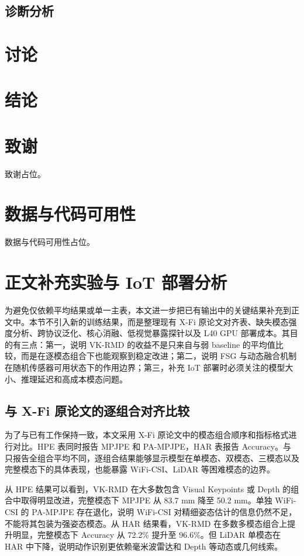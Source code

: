 \documentclass[journal]{IEEEtran}
\begin{document}
\subsection{诊断分析}

\section{讨论}

\section{结论}

\section*{致谢}
致谢占位。

\section*{数据与代码可用性}
数据与代码可用性占位。

\section{正文补充实验与 IoT 部署分析}

为避免仅依赖平均结果或单一主表，本文进一步把已有输出中的关键结果补充到正文中。本节不引入新的训练结果，而是整理现有 X-Fi 原论文对齐表、缺失模态强度分析、跨协议泛化、核心消融、低视觉暴露探针以及 L40 GPU 部署成本。其目的有三点：第一，说明 VK-RMD 的收益不是只来自与弱 baseline 的平均值比较，而是在逐模态组合下也能观察到稳定改进；第二，说明 FSG 与动态融合机制在随机传感器可用状态下的作用边界；第三，补充 IoT 部署时必须关注的模型大小、推理延迟和高成本模态问题。

\subsection{与 X-Fi 原论文的逐组合对齐比较}

为了与已有工作保持一致，本文采用 X-Fi 原论文中的模态组合顺序和指标格式进行对比。HPE 表同时报告 MPJPE 和 PA-MPJPE，HAR 表报告 Accuracy。与只报告全组合平均不同，逐组合结果能够显示模型在单模态、双模态、三模态以及完整模态下的具体表现，也能暴露 WiFi-CSI、LiDAR 等困难模态的边界。




从 HPE 结果可以看到，VK-RMD 在大多数包含 Visual Keypoints 或 Depth 的组合中取得明显改进，完整模态下 MPJPE 从 83.7 mm 降至 50.2 mm。单独 WiFi-CSI 的 PA-MPJPE 存在退化，说明 WiFi-CSI 对精细姿态估计的信息仍然不足，不能将其包装为强姿态模态。从 HAR 结果看，VK-RMD 在多数多模态组合上提升明显，完整模态下 Accuracy 从 72.2\% 提升至 96.6\%。但 LiDAR 单模态在 HAR 中下降，说明动作识别更依赖毫米波雷达和 Depth 等动态或几何线索。
\end{document}
